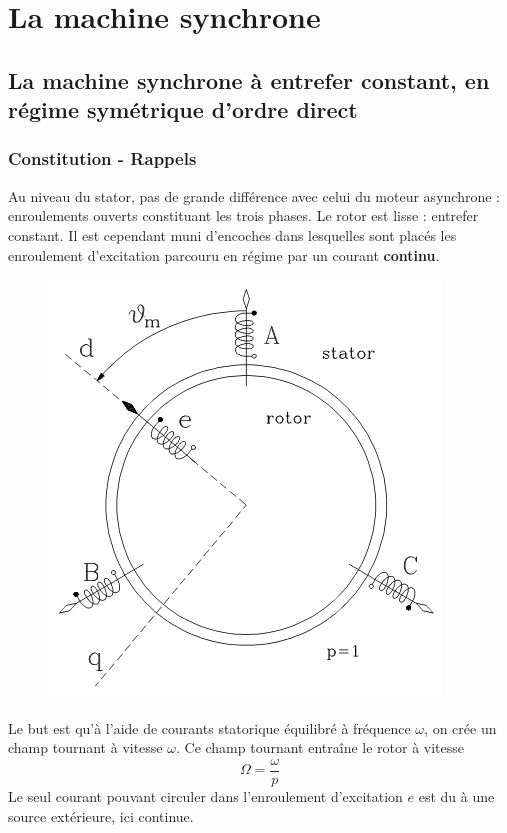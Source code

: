 \chapter{La machine synchrone}

\section{La machine synchrone à entrefer constant, en régime symétrique
d'ordre direct}

	\subsection{Constitution - Rappels}
	Au niveau du stator, pas de grande différence avec celui du moteur 
	asynchrone : enroulements ouverts constituant les trois phases. Le 
	rotor est lisse : entrefer constant. Il est cependant muni d'encoches 
	dans lesquelles sont placés les enroulement d'excitation parcouru en 
	régime par un courant \textbf{continu}.\\
		\begin{figure}
		\vspace{-5mm}
	\includegraphics[scale=0.3]{ch7/image1.png}
	\label{fig:schema7}
	\end{figure}	
	Le but est qu'à l'aide de courants statorique équilibré à fréquence 
	$\omega$, on crée un champ tournant à vitesse $\omega$. Ce champ 
	tournant entraîne le rotor à vitesse
	\begin{equation}
	\Omega = \dfrac{\omega}{p}
	\end{equation}
	Le seul courant pouvant circuler dans l'enroulement d'excitation $e$ 
	est du à une source extérieure, ici continue.\\

